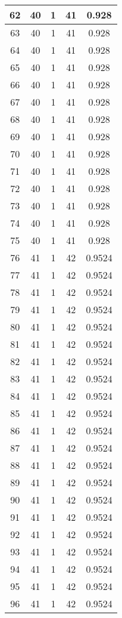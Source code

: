 \documentclass[letterpaper, 12pt]{article}
\begin{document}
\begin{longtable}{|c|c|c|c|c|}
\hline
62 & 40 & 1 & 41 & 0.928 \\
\hline
63 & 40 & 1 & 41 & 0.928 \\
\hline
64 & 40 & 1 & 41 & 0.928 \\
\hline
65 & 40 & 1 & 41 & 0.928 \\
\hline
66 & 40 & 1 & 41 & 0.928 \\
\hline
67 & 40 & 1 & 41 & 0.928 \\
\hline
68 & 40 & 1 & 41 & 0.928 \\
\hline
69 & 40 & 1 & 41 & 0.928 \\
\hline
70 & 40 & 1 & 41 & 0.928 \\
\hline
71 & 40 & 1 & 41 & 0.928 \\
\hline
72 & 40 & 1 & 41 & 0.928 \\
\hline
73 & 40 & 1 & 41 & 0.928 \\
\hline
74 & 40 & 1 & 41 & 0.928 \\
\hline
75 & 40 & 1 & 41 & 0.928 \\
\hline
76 & 41 & 1 & 42 & 0.9524 \\
\hline
77 & 41 & 1 & 42 & 0.9524 \\
\hline
78 & 41 & 1 & 42 & 0.9524 \\
\hline
79 & 41 & 1 & 42 & 0.9524 \\
\hline
80 & 41 & 1 & 42 & 0.9524 \\
\hline
81 & 41 & 1 & 42 & 0.9524 \\
\hline
82 & 41 & 1 & 42 & 0.9524 \\
\hline
83 & 41 & 1 & 42 & 0.9524 \\
\hline
84 & 41 & 1 & 42 & 0.9524 \\
\hline
85 & 41 & 1 & 42 & 0.9524 \\
\hline
86 & 41 & 1 & 42 & 0.9524 \\
\hline
87 & 41 & 1 & 42 & 0.9524 \\
\hline
88 & 41 & 1 & 42 & 0.9524 \\
\hline
89 & 41 & 1 & 42 & 0.9524 \\
\hline
90 & 41 & 1 & 42 & 0.9524 \\
\hline
91 & 41 & 1 & 42 & 0.9524 \\
\hline
92 & 41 & 1 & 42 & 0.9524 \\
\hline
93 & 41 & 1 & 42 & 0.9524 \\
\hline
94 & 41 & 1 & 42 & 0.9524 \\
\hline
95 & 41 & 1 & 42 & 0.9524 \\
\hline
96 & 41 & 1 & 42 & 0.9524 \\

\end{longtable}
\end{document}
